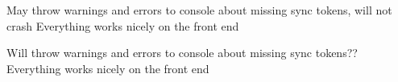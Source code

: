 
\begin{DoxyRefList}
\item[\label{bug__bug000001}%
\Hypertarget{bug__bug000001}%
Member \mbox{\hyperlink{classnews_a048f06e78e76602e4a8d2eb560bf9a23}{news\+:\+:on\+\_\+reload}} ()]May throw warnings and errors to console about missing sync tokens, will not crash Everything works nicely on the front end  
\item[\label{bug__bug000002}%
\Hypertarget{bug__bug000002}%
Member \mbox{\hyperlink{classsocial_aed7a46c6bae233cd68a61aefc8ba3915}{social\+:\+:on\+\_\+reload}} ()]Will throw warnings and errors to console about missing sync tokens?? Everything works nicely on the front end 
\end{DoxyRefList}